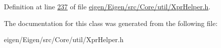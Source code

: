 Definition at line \hyperlink{eigen_2_eigen_2src_2_core_2util_2_xpr_helper_8h_source_l00237}{237} of file \hyperlink{eigen_2_eigen_2src_2_core_2util_2_xpr_helper_8h_source}{eigen/\+Eigen/src/\+Core/util/\+Xpr\+Helper.\+h}.



The documentation for this class was generated from the following file\+:\begin{DoxyCompactItemize}
\item 
eigen/\+Eigen/src/\+Core/util/\+Xpr\+Helper.\+h\end{DoxyCompactItemize}
